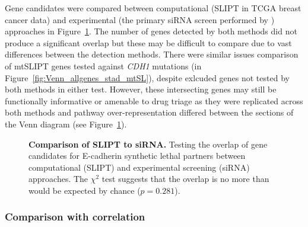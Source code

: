 Gene candidates were compared between computational (SLIPT in TCGA breast cancer data) and experimental (the primary siRNA screen performed by \citet{Telford2015}) approaches in Figure~\ref{fig:Venn_allgenes}. The number of genes detected by both methods did not produce a significant overlap but these may be difficult to compare due to vast differences between the detection methods. There were similar issues comparison of mtSLIPT genes tested against \textit{CDH1} mutations (in Figure~\ref{fig:Venn_allgenes_stad_mtSL}), despite exlcuded genes not tested by both methods in either test. However, these intersecting genes may still be functionally informative or amenable to drug triage as they were replicated across both methods and pathway over-represent\-ation differed between the sections of the Venn diagram (see Figure~\ref{fig:Venn_allgenes}).

\begin{figure}[!ht]
\begin{mdframed}
  \centering
    \caption[Comparison of SLIPT to siRNA]{\small \textbf{Comparison of SLIPT to siRNA.} Testing the overlap of gene candidates for E-cadherin synthetic lethal partners between computational (SLIPT) and experimental screening (siRNA) approaches. The $\chi^2$ test suggests that the overlap is no more than would be expected by chance ($p = 0.281$). %
}
\label{fig:Venn_allgenes}
\end{mdframed}
\end{figure}


\FloatBarrier

\subsubsection{Comparison with correlation} \label{chapt3:compare_correlation} 

